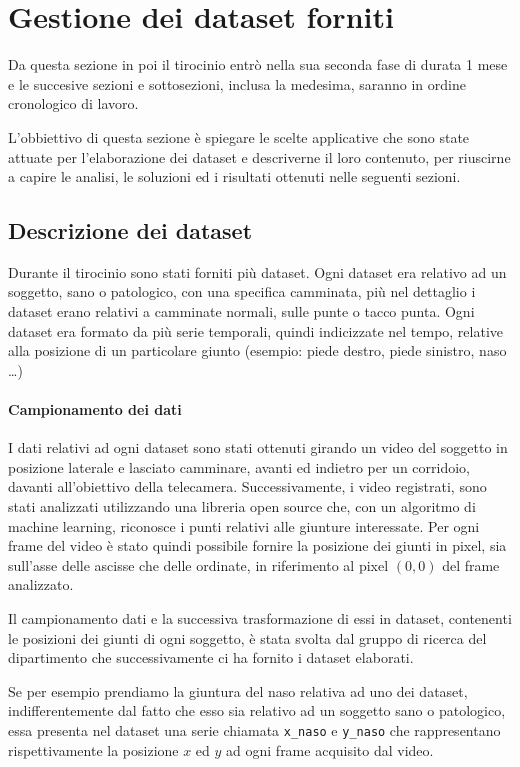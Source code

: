 \section{Gestione dei dataset forniti}
Da questa sezione in poi il tirocinio entrò nella sua seconda fase di durata 1 mese e le succesive
sezioni e sottosezioni, inclusa la medesima, saranno in ordine cronologico di lavoro.

L'obbiettivo di questa sezione è spiegare le scelte applicative che sono state attuate
per l'elaborazione dei dataset e descriverne il loro contenuto, per 
riuscirne a capire le analisi, le soluzioni ed i risultati ottenuti nelle seguenti sezioni. 




\subsection{Descrizione dei dataset}
Durante il tirocinio sono stati forniti più dataset.
Ogni dataset era relativo ad un soggetto, sano o patologico, con una specifica camminata,
più nel dettaglio i dataset erano relativi a camminate normali, sulle punte o tacco punta.
Ogni dataset era formato da più serie temporali, quindi indicizzate nel tempo, relative
alla posizione di un particolare giunto (esempio: piede destro, piede sinistro, naso \dots)

\paragraph{Campionamento dei dati} I dati relativi ad ogni dataset sono stati ottenuti girando un video del soggetto in posizione
laterale e lasciato camminare, avanti ed indietro per un corridoio, davanti all'obiettivo della telecamera. 
Successivamente, i video registrati, sono stati analizzati utilizzando una libreria open source che, con un algoritmo
di machine learning, riconosce i punti relativi alle giunture interessate. Per ogni frame del video
è stato quindi possibile fornire la posizione dei giunti in pixel, sia sull'asse delle
ascisse che delle ordinate, in riferimento al pixel $(0,0)$ del frame analizzato.

Il campionamento dati e la successiva trasformazione di essi in dataset, contenenti le posizioni
dei giunti di ogni soggetto, è stata svolta dal gruppo di ricerca del dipartimento che successivamente
ci ha fornito i dataset elaborati.


\begin{esempio}
    Se per esempio prendiamo la giuntura del naso relativa ad uno dei dataset, indifferentemente
    dal fatto che esso sia relativo ad un soggetto sano o patologico, essa presenta nel dataset una serie
    chiamata \texttt{x\_naso} e \texttt{y\_naso} che rappresentano rispettivamente 
    la posizione $x$ ed $y$ ad ogni frame acquisito dal video.
\end{esempio}

